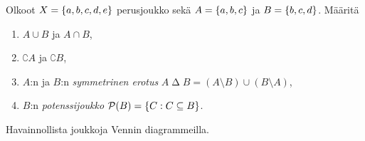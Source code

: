 \documentclass[11pt,a4paper]{amsart}
\begin{document}
\begin{exercise}
Olkoot \(X = \left\lbrace a, b, c, d, e\right\rbrace\) perusjoukko sekä
\(A = \left\lbrace a, b, c\right\rbrace\) ja \(B = \left\lbrace b, c, d\right\rbrace\).
Määritä
\begin{enumerate}[label=\alph*), nosep]
\item \(A \cup B\) ja \(A \cap B\),
\item \(\complement{A}\) ja \(\complement{B}\),
\item \(A\):n ja \(B\):n \emph{symmetrinen erotus} \(A \mathbin{\Delta} B = (A
\setminus B) \cup (B \setminus A)\),
\item \(B\):n \emph{potenssijoukko} \(\mathcal{P}\!\left(B\right) = \left\lbrace C : C
\subseteq B\right\rbrace\).
\end{enumerate}
Havainnollista joukkoja Vennin diagrammeilla.
\end{exercise}
\end{document}
